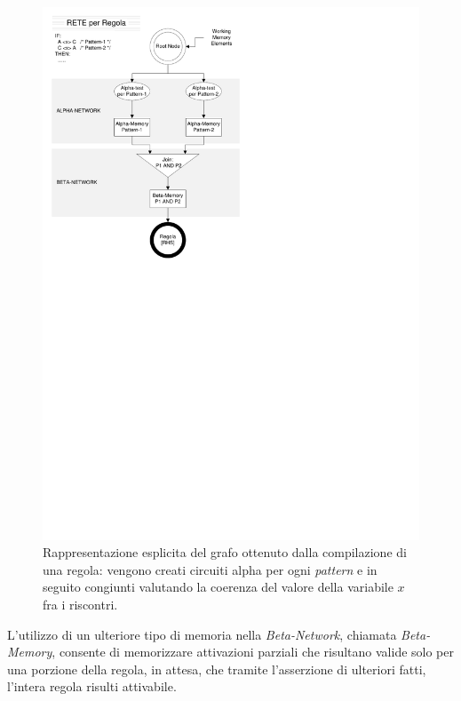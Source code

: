 \begin{figure}
\centering
\includegraphics[viewport=14 446 312 829]{Immagini/Capitolo1/RETE-Regola.pdf}
\caption[Grafo esplicito di RETE per una regola]{Rappresentazione esplicita del grafo ottenuto dalla compilazione di una regola: vengono creati circuiti alpha per ogni \emph{pattern} e in seguito congiunti valutando la coerenza del valore della variabile $x$ fra i riscontri.}\label{fig:grafo-regola}
\end{figure}

L'utilizzo di un ulteriore tipo di memoria nella \emph{Beta-Network}, chiamata \emph{Beta-Memory}, consente di memorizzare attivazioni parziali che risultano valide solo per una porzione della regola, in attesa, che tramite l'asserzione di ulteriori fatti, l'intera regola risulti attivabile.

